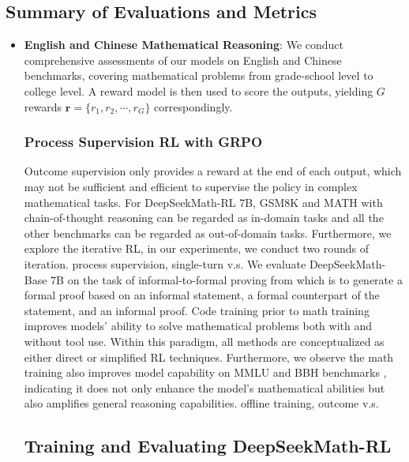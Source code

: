 \begin{itemize}[topsep=0pt]
\subsection{Summary of Evaluations and Metrics}

\begin{itemize}[topsep=0pt]
    \item \textbf{English and Chinese Mathematical Reasoning}: We conduct comprehensive assessments of our models on English and Chinese benchmarks, covering mathematical problems from grade-school level to college level. A reward model is then used to score the outputs, yielding $G$ rewards  $\mathbf{r}=\{r_1, r_2, \cdots, r_G\}$ correspondingly. \subsubsection{Process Supervision RL with GRPO} Outcome supervision only provides a reward at the end of each output, which may not be sufficient and efficient to supervise the policy in complex mathematical tasks. For DeepSeekMath-RL 7B, GSM8K and MATH with chain-of-thought reasoning can be regarded as in-domain tasks and all the other benchmarks can be regarded as out-of-domain tasks. Furthermore, we explore the iterative RL, in our experiments, we conduct two rounds of iteration. process supervision, single-turn v.s. We evaluate DeepSeekMath-Base 7B on the task of informal-to-formal proving from \citep{dsp_proof} which is to generate a formal proof based on an informal statement, a formal counterpart of the statement, and an informal proof. Code training prior to math training improves models' ability to solve mathematical problems both with and without tool use. Within this paradigm, all methods are conceptualized as either direct or simplified  RL techniques. Furthermore, we observe the math training also improves model capability on MMLU \citep{mmlu} and BBH benchmarks \citep{bbh}, indicating it does not only enhance the model's mathematical abilities but also amplifies general reasoning capabilities. offline training, outcome v.s. \subsection{Training and Evaluating DeepSeekMath-RL}


\end{itemize}
\end{itemize}
